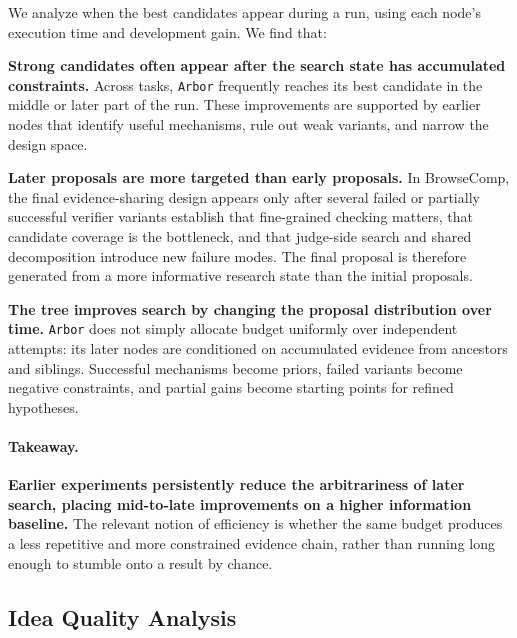 \documentclass[]{selfevolagent}
\theoremstyle{plain}
\theoremstyle{definition}
\theoremstyle{remark}
\newcommand{\arbor}{\texttt{Arbor}}
\begin{document}
We analyze when the best candidates appear during a run, using each node's execution time and development gain. We find that:
 
\textbf{Strong candidates often appear after the search state has accumulated constraints.}
Across tasks, \arbor{} frequently reaches its best candidate in the middle or later part of the run. These improvements are supported by earlier nodes that identify useful mechanisms, rule out weak variants, and narrow the design space.
 
\textbf{Later proposals are more targeted than early proposals.}
In BrowseComp, the final evidence-sharing design appears only after several failed or partially successful verifier variants establish that fine-grained checking matters, that candidate coverage is the bottleneck, and that judge-side search and shared decomposition introduce new failure modes. The final proposal is therefore generated from a more informative research state than the initial proposals.
 
\textbf{The tree improves search by changing the proposal distribution over time.}
\arbor{} does not simply allocate budget uniformly over independent attempts: its later nodes are conditioned on accumulated evidence from ancestors and siblings. Successful mechanisms become priors, failed variants become negative constraints, and partial gains become starting points for refined hypotheses.
 
\paragraph{Takeaway.}
\textbf{Earlier experiments persistently reduce the arbitrariness of later search, placing mid-to-late improvements on a higher information baseline.}
The relevant notion of efficiency is whether the same budget produces a less repetitive and more constrained evidence chain, rather than running long enough to stumble onto a result by chance.
 
\subsection{Idea Quality Analysis}
\label{sec:discussion-ideas}
 
\end{document}
